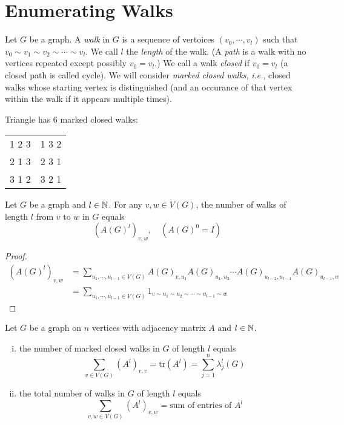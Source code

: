 \section{Enumerating Walks}

\begin{definition}[Walk]
Let \(G\) be a graph.
A \emph{walk} in \(G\) is a sequence of vertoices \((v_0,\cdots,v_l)\) such that \(v_0\sim v_1\sim v_2\sim\cdots\sim v_l\).
We call \(l\) the \emph{length} of the walk.
(A \emph{path} is a walk with no vertices repeated except possibly \(v_0=v_l\).)
We call a walk \emph{closed} if \(v_0=v_l\)
(a closed path is called cycle).
We will consider \emph{marked closed walks}, \textit{i.e.}, closed walks whose starting vertex is distinguished (and an occurance of that vertex within the walk if it appears multiple times).
\end{definition}

\begin{example}
Triangle has 6 marked closed walks:
\begin{center}
\begin{tabular}{cc}
1 2 3 & 1 3 2\\
2 1 3 & 2 3 1\\
3 1 2 & 3 2 1
\end{tabular}
\end{center}
\end{example}

\begin{lemma}
Let \(G\) be a graph and \(l\in\mathbb{N}\).
For any \(v,w\in V(G)\), the number of walks of length \(l\) from \(v\) to \(w\) in \(G\) equals
\[ \left(A(G)^l\right)_{v,w}, \quad (A(G)^0=I ) \]
\end{lemma}
\begin{proof}
\begin{align*}
    \left(A(G)^l\right)_{v,w}&=\sum_{u_1,\cdots,u_{l-1}\in V(G)} A(G)_{v,u_1} A(G)_{u_1,u_2}\cdots A(G)_{u_{l-2},u_{l-1}} A(G)_{u_{l-1},w}\\
&=\sum_{u_1,\cdots,u_{l-1}\in V(G)} 1_{v\sim u_1\sim u_2\sim\cdots\sim u_{l-1}\sim w } 
\end{align*}
\end{proof}

\begin{corollary}
Let \(G\) be a graph on \(n\) vertices with adjacency matrix \(A\) and \(l\in\mathbb{N}\).
\begin{enumerate}[(i)]
\item the number of marked closed walks in \(G\) of length \(l\) equals
\[ \sum_{v\in V(G)} \left(A^l\right)_{v,v}=\mathrm{tr}\left(A^l\right)=\sum_{j=1}^{n}\lambda_j^l(G) \]
\item the total number of walks in \(G\) of length \(l\) equals
\[ \sum_{v,w\in V(G)} \left(A^{l}\right)_{v,w}=\text{sum of entries of }A^l \]
\end{enumerate}
\end{corollary}

